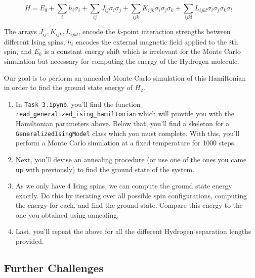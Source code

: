 \documentclass[12pt]{article}
\begin{document}
$$
H = E_0
+ \sum_{i} h_{i}\sigma_i
+ \sum_{ij} J_{ij}\sigma_i\sigma_j
+ \sum_{ijk} K_{ijk}\sigma_i\sigma_j\sigma_k
+ \sum_{ijkl} L_{ijkl}\sigma_i\sigma_j\sigma_k\sigma_l
$$

The arrays $J_{ij}, K_{ijk}, L_{ijkl}$, encode the $k$-point
interaction strengths between different Ising spins, $h_i$ encodes the
external magnetic field applied to the $i$th spin, and $E_0$ is a constant
energy shift which is irrelevant for the Monte Carlo simulation but
necessary for computing the energy of the Hydrogen molecule.

Our goal is to perform an annealed Monte Carlo simulation of this
Hamiltonian in order to find the ground state energy of $H_2$.

\begin{enumerate}
    \item In \texttt{Task\_3.ipynb}, you'll find the function \texttt{read\_generalized\_ising\_hamiltonian}
          which will provide you with the Hamiltonian parameters above. Below that, you'll
          find a skeleton for a \texttt{GeneralizedIsingModel} class which you must complete.
          With this, you'll perform a Monte Carlo simulation at a fixed temperature for 1000 steps.

    \item Next, you'll devise an annealing procedure (or use one of the ones you came up with previously)
          to find the ground state of the system.

    \item As we only have 4 Ising spins, we can compute the ground state energy exactly.
          Do this by iterating over all possible spin configurations, computing the energy
          for each, and find the ground state. Compare this energy to the one you obtained
          using annealing.

    \item Last, you'll repeat the above for all the different Hydrogen separation lengths provided.
\end{enumerate}

\subsection*{Further Challenges} \label{sec:challenges}
\end{document}
